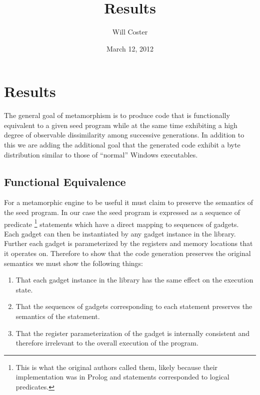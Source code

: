 \documentclass[finalcopy,short]{srpaper}
\title{Results}
\author{Will Coster}
\date{March 12, 2012}
\begin{document}
    \frontmatter

    \chapter{Results}

        The general goal of metamorphism is to produce code that is functionally
        equivalent to a given seed program while at the same time exhibiting a
        high degree of observable dissimilarity among successive generations.
        In addition to this we are adding the additional goal that the generated
        code exhibit a byte distribution similar to those of ``normal'' Windows
        executables.

    \section{Functional Equivalence}

        For a metamorphic engine to be useful it must claim to preserve the
        semantics of the seed program. In our case the seed program is expressed
        as a sequence of predicate \footnote{This is what the original authors
        called them, likely because their implementation was in Prolog and
        statements corresponded to logical predicates.} statements which have a
        direct mapping to sequences of gadgets. Each gadget can then be
        instantiated by any gadget instance in the library. Further each gadget
        is parameterized by the registers and memory locations that it operates
        on. Therefore to show that the code generation preserves the original
        semantics we must show the following things:

        \begin{enumerate}

            \item That each gadget instance in the library has the same effect
                on the execution state.

            \item That the sequences of gadgets corresponding to each statement
                preserves the semantics of the statement.

            \item That the register parameterization of the gadget is internally
                consistent and therefore irrelevant to the overall execution of
                the program.

        \end{enumerate}
\end{document}
